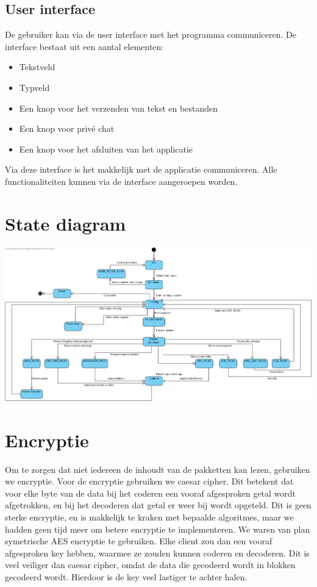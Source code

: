 \documentclass{article}
\begin{document}
\subsection{User interface}
De gebruiker kan via de user interface met het programma communiceren. De interface bestaat uit een aantal elementen:
\begin{itemize}
\item Tekstveld
\item Typveld
\item Een knop voor het verzenden van tekst en bestanden
\item Een knop voor priv\'{e} chat
\item Een knop voor het afsluiten van het applicatie
\end{itemize}

Via deze interface is het makkelijk met de applicatie communiceren. Alle functionaliteiten kunnen via de interface aangeroepen worden. 

\section{State diagram}
\includegraphics[angle=90, scale=0.6]{chatapplication.png}


\section{Encryptie}
Om te zorgen dat niet iedereen de inhoudt van de pakketten kan lezen, gebruiken we encryptie. Voor de encryptie gebruiken we caesar cipher. Dit betekent dat voor elke byte van de data bij het coderen een vooraf afgesproken getal wordt afgetrokken, en bij het decoderen dat getal er weer bij wordt opgeteld. Dit is geen sterke encryptie, en is makkelijk te kraken met bepaalde algoritmes, maar we hadden geen tijd meer om betere encryptie te implementeren. We waren van plan symetrische AES encryptie te gebruiken. Elke client zou dan een vooraf afgesproken key hebben, waarmee ze zouden kunnen coderen en decoderen. Dit is veel veiliger dan caesar cipher, omdat de data die gecodeerd wordt in blokken gecodeerd wordt. Hierdoor is de key veel lastiger te achter halen. \\
\end{document}
